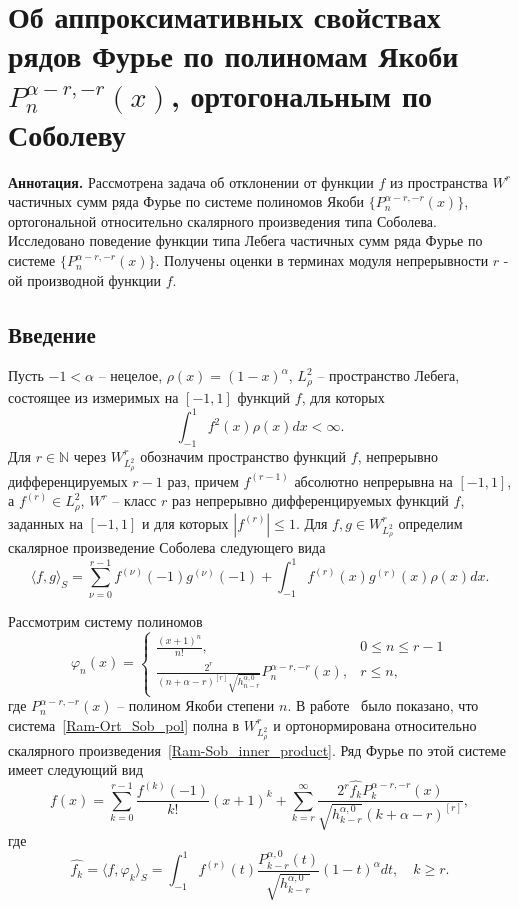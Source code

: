 \section{Об аппроксимативных свойствах рядов Фурье по полиномам Якоби $P_n^{\alpha-r,-r}(x)$, ортогональным по Соболеву}\label{Ram-Jac}

\textbf{ Аннотация.} Рассмотрена задача об отклонении от функции $f$ из пространства $W^r$ частичных сумм ряда Фурье по системе полиномов Якоби $\{P_n^{\alpha-r,-r}(x)\}$, ортогональной относительно скалярного произведения типа Соболева. Исследовано поведение функции типа Лебега частичных сумм ряда Фурье по системе $\{P_n^{\alpha-r,-r}(x)\}$. Получены оценки в терминах модуля непрерывности $r$ - ой производной функции $f$.

\subsection{Введение}

Пусть $-1<\alpha$ -- нецелое, $\rho(x)=(1-x)^\alpha$, $L_\rho^2$ -- пространство Лебега, состоящее из измеримых на $[-1,1]$ функций $f$, для которых
$$
\int_{-1}^{1}f^2(x)\rho(x)dx<\infty.
$$
Для $r\in\mathbb{N}$ через $W^r_{L_\rho^2}$ обозначим пространство функций $f$, непрерывно дифференцируемых $r-1$ раз, причем $f^{(r-1)}$ абсолютно непрерывна на $[-1,1]$, а $f^{(r)}\in L_\rho^2$, $W^r$ -- класс $r$ раз непрерывно дифференцируемых функций $f$, заданных на $[-1,1]$ и для которых $|f^{(r)}|\le 1$.
Для $f,g\in W^r_{L_\rho^2}$ определим скалярное произведение Соболева следующего вида
\begin{equation}\label{Ram-Sob_inner_product}
\langle f,g\rangle_S=\sum_{\nu=0}^{r-1}f^{(\nu)}(-1)g^{(\nu)}(-1)+\int_{-1}^{1}f^{(r)}(x)g^{(r)}(x)\rho(x)dx.
\end{equation}

Рассмотрим систему полиномов
\begin{equation}\label{Ram-Ort_Sob_pol}
	\varphi_n(x)=
	\begin{cases}
		\frac{(x+1)^n}{n!}, & 0\le n\le r-1 \\
		\frac{2^r}{(n+\alpha-r)^{[r]}\sqrt{h_{n-r}^{\alpha,0}}}P_n^{\alpha-r,-r}(x), & r\le n,
	\end{cases}
\end{equation}
где $P_n^{\alpha-r,-r}(x)$ -- полином Якоби степени $n$. В работе~\cite{Ram-SharMN} было показано, что система~\eqref{Ram-Ort_Sob_pol} полна в $W^r_{L_\rho^2}$ и ортонормирована относительно скалярного произведения~\eqref{Ram-Sob_inner_product}. Ряд Фурье по этой системе имеет следующий вид
\begin{equation}\label{Ram-Fourier_series} f(x)=\sum_{k=0}^{r-1}\frac{f^{(k)}(-1)}{k!}(x+1)^k+\sum_{k=r}^{\infty}\frac{2^r\widehat{f_k}P_k^{\alpha-r,-r}(x)}{\sqrt{h_{k-r}^{\alpha,0}}(k+\alpha-r)^{[r]}},
\end{equation}
где
$$
\widehat{f_k}=\langle f,\varphi_k\rangle_S=\int_{-1}^{1}f^{(r)}(t)\frac{P_{k-r}^{\alpha,0}(t)}{\sqrt{h_{k-r}^{\alpha,0}}}(1-t)^\alpha dt, \quad k\ge r.
$$

